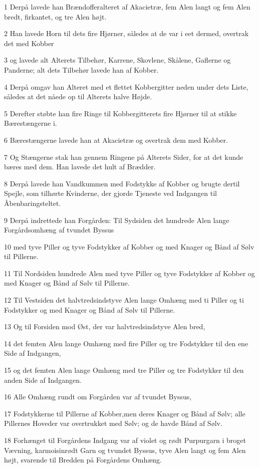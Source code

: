 \par 1 Derpå lavede han Brændofferalteret af Akacietræ, fem Alen langt og fem Alen bredt, firkantet, og tre Alen højt.
\par 2 Han lavede Horn til dets fire Hjørner, således at de var i eet dermed, overtrak det med Kobber
\par 3 og lavede alt Alterets Tilbehør, Karrene, Skovlene, Skålene, Gaflerne og Panderne; alt dets Tilbehør lavede han af Kobber.
\par 4 Derpå omgav han Alteret med et flettet Kobbergitter neden under dets Liste, således at det nåede op til Alterets halve Højde.
\par 5 Derefter støbte han fire Ringe til Kobbergitterets fire Hjørner til at stikke Bærestængerne i.
\par 6 Bærestængerne lavede han at Akacietræ og overtrak dem med Kobber.
\par 7 Og Stængerne stak han gennem Ringene på Alterets Sider, for at det kunde bæres med dem. Han lavede det hult af Brædder.
\par 8 Derpå lavede han Vandkummen med Fodstykke af Kobber og brugte dertil Spejle, som tilhørte Kvinderne, der gjorde Tjeneste ved Indgangen til Åbenbaringsteltet.
\par 9 Derpå indrettede han Forgården: Til Sydsiden det hundrede Alen lange Forgårdsomhæng af tvundet Byssus
\par 10 med tyve Piller og tyve Fodstykker af Kobber og med Knager og Bånd af Sølv til Pillerne.
\par 11 Til Nordsiden hundrede Alen med tyve Piller og tyve Fodstykker af Kobber og med Knager og Bånd af Sølv til Pillerne.
\par 12 Til Vestsiden det halvtredsindstyve Alen lange Omhæng med ti Piller og ti Fodstykker og med Knager og Bånd af Sølv til Pillerne.
\par 13 Og til Forsiden mod Øst, der var halvtredsindstyve Alen bred,
\par 14 det femten Alen lange Omhæng med fire Piller og tre Fodstykker til den ene Side af Indgangen,
\par 15 og det femten Alen lange Omhæng med tre Piller og tre Fodstykker til den anden Side af Indgangen.
\par 16 Alle Omhæng rundt om Forgården var af tvundet Byssus,
\par 17 Fodstykkerne til Pillerne af Kobber,men deres Knager og Bånd af Sølv; alle Pillernes Hoveder var overtrukket med Sølv; og de havde Bånd af Sølv.
\par 18 Forhænget til Forgårdens Indgang var af violet og rødt Purpurgarn i broget Vævning, karmoisinrødt Garn og tvundet Byssus, tyve Alen langt og fem Alen højt, svarende til Bredden på Forgårdens Omhæng.
